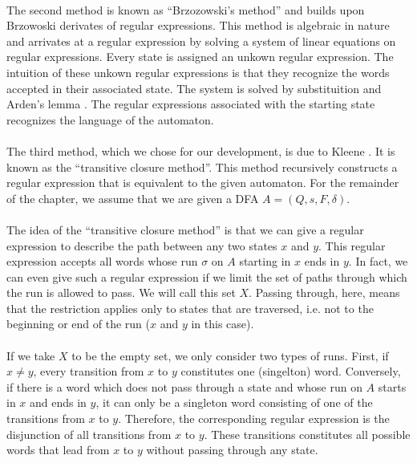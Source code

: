 \paragraph{}
The second method is known as ``Brzozowski's method'' \cite{DBLP:journals/jacm/Brzozowski64} and builds upon Brzowoski derivates of regular expressions.
This method is algebraic in nature and arrivates at a regular expression by solving a system of linear equations on regular expressions. 
Every state is assigned an unkown regular expression. 
The intuition of these unkown regular expressions is that they recognize the words accepted in their associated state. 
The system is solved by substituition and Arden's lemma \cite{DBLP:conf/focs/Arden61}.
The regular expressions associated with the starting state recognizes the language of the automaton.

\paragraph{}
The third method, which we chose for our development, is due to Kleene \cite{KleeneNets}.
It is known as the ``transitive closure method''.
This method recursively constructs a regular expression that is equivalent to the given automaton.
For the remainder of the chapter, we assume that we are given a DFA $A=(Q,s,F,\delta)$.

\paragraph{}
The idea of the ``transitive closure method'' is that we can give a regular expression to describe the path between any two states $x$ and $y$.
This regular expression accepts all words whose run $\sigma$ on $A$ starting in $x$ ends in $y$.
In fact, we can even give such a regular expression if we limit the set of paths through which the run is allowed to pass. 
We will call this set $X$.
Passing through, here, means that the restriction applies only to states that are traversed, i.e. not to the beginning or end of the run ($x$ and $y$ in this case).

\paragraph{}
If we take $X$ to be the empty set, we only consider two types of runs.
First, if $x \neq y$, every transition from $x$ to $y$ constitutes one (singelton) word. 
Conversely, if there is a word which does not pass through a state and whose run on $A$ starts in $x$ and ends in $y$, 
it can only be a singleton word consisting of one of the transitions from $x$ to $y$.
Therefore, the corresponding regular expression is the disjunction of all transitions from $x$ to $y$. 
These transitions constitutes all possible words that lead from $x$ to $y$ without passing through any state.

